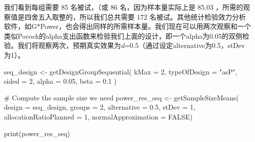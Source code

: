\documentclass[
  letterpaper,
  DIV=11,
  numbers=noendperiod]{scrreprt}
\newenvironment{Shaded}{\begin{snugshade}}{\end{snugshade}}
\newcommand{\AttributeTok}[1]{\textcolor[rgb]{0.40,0.45,0.13}{#1}}
\newcommand{\CommentTok}[1]{\textcolor[rgb]{0.37,0.37,0.37}{#1}}
\newcommand{\ConstantTok}[1]{\textcolor[rgb]{0.56,0.35,0.01}{#1}}
\newcommand{\DecValTok}[1]{\textcolor[rgb]{0.68,0.00,0.00}{#1}}
\newcommand{\FloatTok}[1]{\textcolor[rgb]{0.68,0.00,0.00}{#1}}
\newcommand{\FunctionTok}[1]{\textcolor[rgb]{0.28,0.35,0.67}{#1}}
\newcommand{\NormalTok}[1]{\textcolor[rgb]{0.00,0.23,0.31}{#1}}
\newcommand{\OtherTok}[1]{\textcolor[rgb]{0.00,0.23,0.31}{#1}}
\newcommand{\StringTok}[1]{\textcolor[rgb]{0.13,0.47,0.30}{#1}}
\begin{document}
我们看到每组需要 85 名被试，（或 86 名，因为样本量实际上是 85.03
，所需的观察值是四舍五入取整的，所以我们总共需要 172
名被试。其他统计检验效力分析软件，如G*Power，也会得出同样的所需样本量。我们现在可以用两次观察和一个类似Pocock的alpha支出函数来检验我们上面的设计，即一个alpha为0.05的双侧检验。我们将观察两次，预期真实效果为\emph{d}=0.5（通过设定alternative为0.5，stDev为1）。

\begin{Shaded}
\begin{Highlighting}[]
\NormalTok{seq\_design }\OtherTok{\textless{}{-}} \FunctionTok{getDesignGroupSequential}\NormalTok{(}
  \AttributeTok{kMax =} \DecValTok{2}\NormalTok{,}
  \AttributeTok{typeOfDesign =} \StringTok{"asP"}\NormalTok{,}
  \AttributeTok{sided =} \DecValTok{2}\NormalTok{,}
  \AttributeTok{alpha =} \FloatTok{0.05}\NormalTok{,}
  \AttributeTok{beta =} \FloatTok{0.1}
\NormalTok{  )}

\CommentTok{\# Compute the sample size we need}
\NormalTok{power\_res\_seq }\OtherTok{\textless{}{-}} \FunctionTok{getSampleSizeMeans}\NormalTok{(}
  \AttributeTok{design =}\NormalTok{ seq\_design,}
  \AttributeTok{groups =} \DecValTok{2}\NormalTok{,}
  \AttributeTok{alternative =} \FloatTok{0.5}\NormalTok{, }
  \AttributeTok{stDev =} \DecValTok{1}\NormalTok{, }
  \AttributeTok{allocationRatioPlanned =} \DecValTok{1}\NormalTok{,}
  \AttributeTok{normalApproximation =} \ConstantTok{FALSE}\NormalTok{)}

\FunctionTok{print}\NormalTok{(power\_res\_seq)}
\end{Highlighting}
\end{Shaded}
\end{document}
